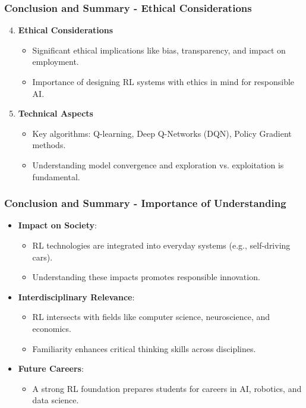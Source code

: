 \documentclass[aspectratio=169]{beamer}
\begin{document}
\begin{frame}[fragile]
    \frametitle{Conclusion and Summary - Ethical Considerations}
    \begin{enumerate}
        \setcounter{enumi}{3} %
        \item \textbf{Ethical Considerations}
        \begin{itemize}
            \item Significant ethical implications like bias, transparency, and impact on employment.
            \item Importance of designing RL systems with ethics in mind for responsible AI.
        \end{itemize}
        
        \item \textbf{Technical Aspects}
        \begin{itemize}
            \item Key algorithms: Q-learning, Deep Q-Networks (DQN), Policy Gradient methods.
            \item Understanding model convergence and exploration vs. exploitation is fundamental.
        \end{itemize}
    \end{enumerate}
\end{frame}

\begin{frame}[fragile]
    \frametitle{Conclusion and Summary - Importance of Understanding}
    \begin{itemize}
        \item \textbf{Impact on Society}:
        \begin{itemize}
            \item RL technologies are integrated into everyday systems (e.g., self-driving cars).
            \item Understanding these impacts promotes responsible innovation.
        \end{itemize}
        
        \item \textbf{Interdisciplinary Relevance}:
        \begin{itemize}
            \item RL intersects with fields like computer science, neuroscience, and economics.
            \item Familiarity enhances critical thinking skills across disciplines.
        \end{itemize}

        \item \textbf{Future Careers}:
        \begin{itemize}
            \item A strong RL foundation prepares students for careers in AI, robotics, and data science.
        \end{itemize}
    \end{itemize}
\end{frame}
\end{document}
